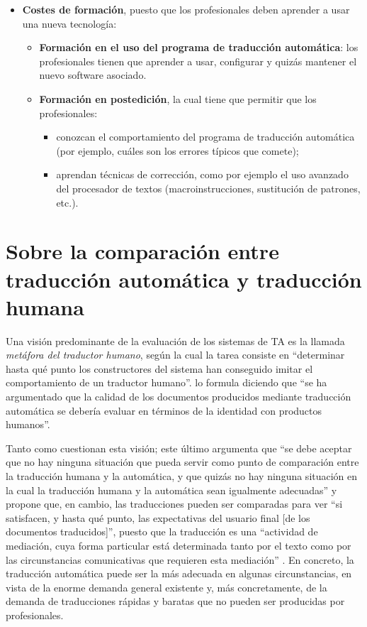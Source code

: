 \begin{itemize}
\item \textbf{Costes de formación}, puesto que los profesionales deben aprender a usar una nueva tecnología: \begin{itemize} \item \textbf{Formación en el uso del programa de traducción automática}: los profesionales tienen que aprender a usar, configurar y quizás mantener el nuevo software asociado. \item \textbf{Formación en postedición}, la cual tiene que permitir que los profesionales: \begin{itemize} \item conozcan el comportamiento del programa de traducción automática (por ejemplo, cuáles son los errores típicos que comete); \item aprendan técnicas de corrección, como por ejemplo el uso avanzado del procesador de textos (macroinstrucciones, sustitución de patrones, etc.). \end{itemize} \end{itemize} \end{itemize} 

\section[Traducción automática y traducción humana]{Sobre la comparación entre traducción automática y traducción humana} \label{ss:humaut} Una visión predominante de la evaluación de los sistemas de TA es la llamada \emph{metáfora del traductor humano}, según la cual \citep{krauwer93j} la tarea consiste en ``determinar hasta qué punto los constructores del sistema han conseguido imitar el comportamiento de un traductor humano''. \citet[p.~262]{sager93b} lo formula diciendo que ``se ha argumentado que la calidad de los documentos producidos mediante traducción automática se debería evaluar en términos de la identidad con productos humanos''. 

Tanto \citet{krauwer93j} como \citet{sager93b} cuestionan esta visión; este último argumenta que ``se debe aceptar que no hay ninguna situación que pueda servir como punto de comparación entre la traducción humana y la automática, y que quizás no hay ninguna situación en la cual la traducción humana y la automática sean igualmente adecuadas'' \citep[p.~261]{sager93b} y propone que, en cambio, las traducciones pueden ser comparadas para ver ``si satisfacen, y hasta qué punto, las expectativas del usuario final [de los documentos traducidos]'', puesto que la traducción es una ``actividad de mediación, cuya forma particular está determinada tanto por el texto como por las circunstancias comunicativas que requieren esta mediación'' \citep[p.~261]{sager93b}. En concreto, la traducción automática puede ser la más adecuada en algunas circunstancias, en vista de la enorme demanda general existente y, más concretamente, de la demanda de traducciones rápidas y baratas que no pueden ser producidas por profesionales. 

